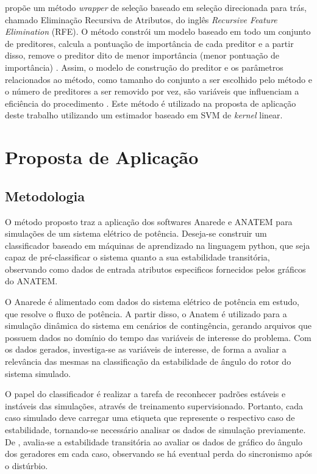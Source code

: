 \documentclass[12pt,oneside,a4paper,chapter=TITLE,section=TITLE,sumario=tradicional,english,brazil]{abntex2}
\begin{document}
\textcite{guyon2003} propõe um método \textit{wrapper} de seleção baseado em seleção direcionada para trás, chamado Eliminação Recursiva de Atributos, do inglês \textit{Recursive Feature Elimination} (RFE). O método constrói um modelo baseado em todo um conjunto de preditores, calcula a pontuação de importância de cada preditor e a partir disso, remove o preditor dito de menor importância (menor pontuação de importância) \cite{guyon2003}. Assim, o modelo de construção do preditor e os parâmetros relacionados ao método, como tamanho do conjunto a ser escolhido pelo método e o número de preditores a ser removido por vez, são variáveis que influenciam a eficiência do procedimento \cite{guyon2003}. Este método é utilizado na proposta de aplicação deste trabalho utilizando um estimador baseado em SVM de \textit{kernel} linear.\par 

\chapter{Proposta de Aplicação}
\section{Metodologia}
O método proposto traz a aplicação dos softwares Anarede e ANATEM para simulações de um sistema elétrico de potência. Deseja-se construir um classificador baseado em máquinas de aprendizado na linguagem python, que seja capaz de pré-classificar o sistema quanto a sua estabilidade transitória, observando como dados de entrada atributos especificos fornecidos pelos gráficos do ANATEM.\par  
O Anarede é alimentado com dados do sistema elétrico de potência em estudo, que resolve o fluxo de potência. A partir disso, o Anatem é utilizado para a simulação dinâmica do sistema em cenários de contingência, gerando arquivos que possuem dados no domínio do tempo das variáveis de interesse do problema. Com os dados gerados, investiga-se as variáveis de interesse, de forma a avaliar a relevância das mesmas na classificação da estabilidade de ângulo do rotor do sistema simulado.\par 
O papel do classificador é realizar a tarefa de reconhecer padrões estáveis e instáveis das simulações, através de treinamento supervisionado. Portanto, cada caso simulado deve carregar uma etiqueta que represente o respectivo caso de estabilidade, tornando-se necessário analisar os dados de simulação previamente. De \cite{silva2019}, avalia-se a estabilidade transitória ao avaliar os dados de gráfico do ângulo dos geradores em cada caso, observando se há eventual perda do sincronismo após o distúrbio. 
\end{document}

